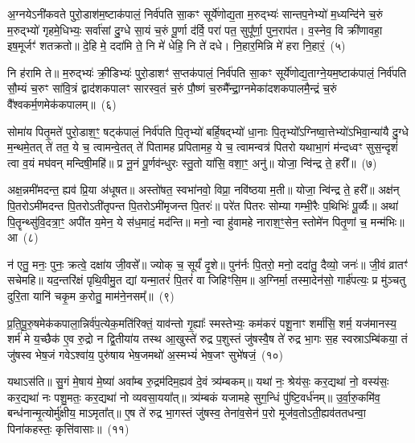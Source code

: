{\anuvakamend[{व॒यं यद् विꣳ॑श॒तिश्च॑}]}%

अ॒ग्नये\-ऽनी॑कवते पुरो॒डाश॑\-म॒ष्टा\-क॑पालं॒ निर्व॑पति सा॒कꣳ सूर्ये॑णोद्य॒ता म॒रुद्भ्यः॑ सान्तप॒नेभ्यो॑ म॒ध्यन्दि॑ने च॒रुं म॒रुद्भ्यो॑ गृहमे॒धिभ्यः॒ सर्वा॑सां दु॒ग्धे सा॒यं च॒रुं पू॒र्णा द॑र्वि॒ परा॑ पत॒ सुपू᳚र्णा॒ पुन॒राप॑त। व॒स्नेव॒ वि क्री॑णावहा॒ इष॒मूर्जꣳ॑ शतक्रतो॥ दे॒हि मे॒ ददा॑मि ते॒ नि मे॑ धेहि॒ नि ते॑ दधे। नि॒हार॒मिन्नि मे॑ हरा नि॒हारं॒~(५)


नि ह॑रामि ते॥ म॒रुद्भ्यः॑ क्री॒डिभ्यः॑ पुरो॒डाशꣳ॑ स॒प्त\-क॑पालं॒ निर्व॑पति सा॒कꣳ सूर्ये॑णोद्य॒ताग्ने॒यम॒ष्टा\-क॑पालं॒ निर्व॑पति सौ॒म्यं च॒रुꣳ सा॑वि॒त्रं द्वाद॑श\-कपालꣳ सारस्व॒तं च॒रुं पौ॒ष्णं च॒रुमै᳚न्द्रा॒ग्नमेका॑\-दश\-कपालमै॒न्द्रं च॒रुं वै᳚श्वकर्म॒णमेक॑कपालम्॥~(६)

{\anuvakamend[{ह॒रा॒ नि॒हारं॑ त्रि॒ꣳ॒शच्च॑}]}%

सोमा॑य पितृ॒मते॑ पुरो॒डाश॒ꣳ॒ षट्\-क॑पालं॒ निर्व॑पति पि॒तृभ्यो॑ बर्\mbox{}हि॒षद्भ्यो॑ धा॒नाः पि॒तृभ्यो᳚\-ऽग्निष्वा॒त्तेभ्यो॑\-ऽभिवा॒न्या॑यै दु॒ग्धे म॒न्थमे॒तत् ते॑ तत॒ ये च॒ त्वामन्वे॒तत् ते॑ पितामह प्रपितामह॒ ये च॒ त्वामन्वत्र॑ पितरो यथाभा॒गं म॑न्दध्वꣳ सुस॒न्दृशं॑ त्वा व॒यं मघ॑वन् मन्दिषी॒महि॑॥ प्र नू॒नं पू॒र्णव॑न्धुरः स्तु॒तो या॑सि॒ वशा॒ꣳ॒ अनु॑॥ योजा॒ न्वि॑न्द्र ते॒ हरी᳚॥~(७)

अक्ष॒न्नमी॑मदन्त॒ ह्यव॑ प्रि॒या अ॑धूषत॥ अस्तो॑षत॒ स्वभा॑नवो॒ विप्रा॒ नवि॑ष्ठया म॒ती॥ योजा॒ न्वि॑न्द्र ते॒ हरी᳚॥ अक्ष॑न् पि॒तरो\-ऽमी॑मदन्त पि॒तरो\-ऽती॑तृपन्त पि॒तरो\-ऽमी॑मृजन्त पि॒तरः॑॥ परे॑त पितरः सोम्या गम्भी॒रैः प॒थिभिः॑ पू॒र्व्यैः॥ अथा॑ पि॒तॄन्थ्सु॑वि॒दत्रा॒ꣳ॒ अपी॑त य॒मेन॒ ये स॑ध॒मादं॒ मद॑न्ति॥ मनो॒ न्वा हु॑वामहे नाराश॒ꣳ॒सेन॒ स्तोमे॑न पितृ॒णां च॒ मन्म॑भिः॥ आ~(८)

न॑ एतु॒ मनः॒ पुनः॒ क्रत्वे॒ दक्षा॑य जी॒वसे᳚॥ ज्योक् च॒ सूर्यं॑ दृ॒शे॥ पुन॑र्नः पि॒तरो॒ मनो॒ ददा॑तु॒ दैव्यो॒ जनः॑॥ जी॒वं व्रातꣳ॑ सचेमहि॥ यद॒न्तरि॑क्षं पृथि॒वीमु॒त द्यां यन्मा॒तरं॑ पि॒तरं॑ वा जिहिꣳसि॒म॥ अ॒ग्निर्मा॒ तस्मा॒देन॑सो॒ गार्\mbox{}ह॑पत्यः॒ प्र मु॑ञ्चतु दुरि॒ता यानि॑ चकृ॒म क॒रोतु॒ माम॑ने॒नसम्᳚॥~(९)

{\anuvakamend[{हरी॒ मन्म॑भि॒रा चतु॑श्चत्वारिꣳशच्च}]}%

प्र॒ति॒पू॒रु॒षमेक॑कपाला॒न्निर्व॑प॒त्येक॒\-मति॑रिक्तं॒ याव॑न्तो गृ॒ह्याः᳚ स्मस्तेभ्यः॒ कम॑करं पशू॒नाꣳ शर्मा॑सि॒ शर्म॒ यज॑मानस्य॒ शर्म॑ मे य॒च्छैक॑ ए॒व रु॒द्रो न द्वि॒तीया॑य तस्थ आ॒खुस्ते॑ रुद्र प॒शुस्तं जु॑षस्वै॒ष ते॑ रुद्र भा॒गः स॒ह स्वस्रा\-ऽम्बि॑कया॒ तं जु॑षस्व भेष॒जं गवे\-ऽश्वा॑य॒ पुरु॑षाय भेष॒जमथो॑ अ॒स्मभ्यं॑ भेष॒जꣳ सुभे॑षजं॒~(१०)

यथा\-ऽस॑ति॥ सु॒गं मे॒षाय॑ मे॒ष्या॑ अवा᳚म्ब रु॒द्रम॑दिम॒ह्यव॑ दे॒वं त्र्य॑म्बकम्॥ यथा॑ नः॒ श्रेय॑सः॒ कर॒द्यथा॑ नो॒ वस्य॑सः॒ कर॒द्यथा॑ नः पशु॒मतः॒ कर॒द्यथा॑ नो व्यवसा॒यया᳚त्॥ त्र्य॑म्बकं यजामहे सुग॒न्धिं पु॑ष्टि॒वर्ध॑नम्॥ उ॒र्वा॒रु॒कमि॑व॒ बन्ध॑नान्मृ॒त्योर्मु॑क्षीय॒ मा\-ऽमृता᳚त्॥ ए॒ष ते॑ रुद्र भा॒गस्तं जु॑षस्व॒ तेना॑व॒सेन॑ प॒रो मूज॑व॒तो\-ऽती॒ह्यव॑ततधन्वा॒ पिना॑कहस्तः॒ कृत्ति॑वासाः॥~(११)

